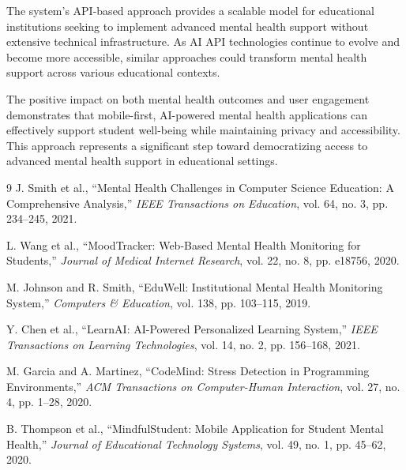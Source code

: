\documentclass[conference,10pt]{IEEEtran}
\begin{document}
The system's API-based approach provides a scalable model for educational institutions seeking to implement advanced mental health support without extensive technical infrastructure. As AI API technologies continue to evolve and become more accessible, similar approaches could transform mental health support across various educational contexts.

The positive impact on both mental health outcomes and user engagement demonstrates that mobile-first, AI-powered mental health applications can effectively support student well-being while maintaining privacy and accessibility. This approach represents a significant step toward democratizing access to advanced mental health support in educational settings.

\begin{thebibliography}{9}
J. Smith et al., ``Mental Health Challenges in Computer Science Education: A Comprehensive Analysis,'' \emph{IEEE Transactions on Education}, vol. 64, no. 3, pp. 234--245, 2021.

L. Wang et al., ``MoodTracker: Web-Based Mental Health Monitoring for Students,'' \emph{Journal of Medical Internet Research}, vol. 22, no. 8, pp. e18756, 2020.

M. Johnson and R. Smith, ``EduWell: Institutional Mental Health Monitoring System,'' \emph{Computers \& Education}, vol. 138, pp. 103--115, 2019.

Y. Chen et al., ``LearnAI: AI-Powered Personalized Learning System,'' \emph{IEEE Transactions on Learning Technologies}, vol. 14, no. 2, pp. 156--168, 2021.

M. Garcia and A. Martinez, ``CodeMind: Stress Detection in Programming Environments,'' \emph{ACM Transactions on Computer-Human Interaction}, vol. 27, no. 4, pp. 1--28, 2020.

B. Thompson et al., ``MindfulStudent: Mobile Application for Student Mental Health,'' \emph{Journal of Educational Technology Systems}, vol. 49, no. 1, pp. 45--62, 2020.
\end{thebibliography}
\end{document}
